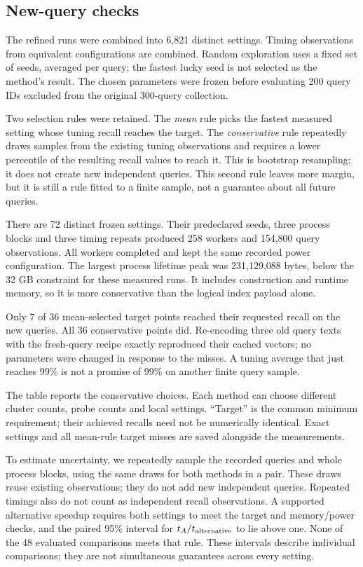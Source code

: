 \subsection{New-query checks}
The refined runs were combined into 6,821 distinct settings. Timing observations from equivalent configurations are combined. Random exploration uses a fixed set of seeds, averaged per query;
the fastest lucky seed is not selected as the method's result. The chosen parameters were
frozen before evaluating 200 query IDs excluded from the original 300-query collection.

Two selection rules were retained. The \emph{mean} rule picks the fastest measured setting whose
tuning recall reaches the target. The \emph{conservative} rule repeatedly draws samples from the existing tuning observations
and requires a lower percentile of the resulting recall values to reach it. This is bootstrap
resampling; it does not create new independent queries. This second rule leaves more margin, but it is still
a rule fitted to a finite sample, not a guarantee about all future queries.

There are 72 distinct frozen settings. Their predeclared seeds, three process blocks and three
timing repeats produced 258 workers and 154,800 query observations. All workers completed and
kept the same recorded power configuration. The largest process lifetime peak was 231,129,088
bytes, below the 32 GB constraint for these measured runs. It includes construction and runtime
memory, so it is more conservative than the logical index payload alone.

Only 7 of 36 mean-selected target points reached their requested recall on the new queries.
All 36 conservative points did. Re-encoding three old query texts with the fresh-query recipe
exactly reproduced their cached vectors; no parameters were changed in response to the misses.
A tuning average that just reaches 99\% is not a promise of 99\% on another finite query sample.


The table reports the conservative choices. Each method can choose different cluster counts,
probe counts and local settings. ``Target'' is the common minimum requirement; their achieved
recalls need not be numerically identical. Exact settings and all mean-rule target misses are
saved alongside the measurements.

To estimate uncertainty, we repeatedly sample the recorded queries and whole process blocks,
using the same draws for both methods in a pair. These draws reuse existing observations;
they do not add new independent queries. Repeated timings also do not count as independent
recall observations.
A supported alternative speedup requires both settings to meet the target and memory/power
checks, and the paired 95\% interval for $t_A/t_{\rm alternative}$ to lie above one. None of the
48 evaluated comparisons meets that rule. These intervals describe individual comparisons;
they are not simultaneous guarantees across every setting.

